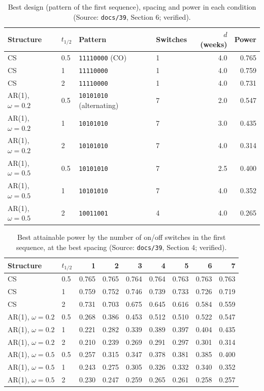 \documentclass[11pt]{article}
\newcommand{\code}[1]{\texttt{#1}}
\begin{document}
\begin{table}[h]
\centering\small
\caption{Best design (pattern of the first sequence), spacing and power
in each condition (Source: \code{docs/39}, Section 6; verified).}
\label{tab:invf-best}
\begin{tabular}{@{}llllrr@{}}
\toprule
Structure & $t_{1/2}$ & Pattern & Switches & $d$ (weeks) & Power \\
\midrule
CS & 0.5 & \code{11110000} (CO) & 1 & 4.0 & 0.765 \\
CS & 1 & \code{11110000} & 1 & 4.0 & 0.759 \\
CS & 2 & \code{11110000} & 1 & 4.0 & 0.731 \\
AR(1), $\omega = 0.2$ & 0.5 & \code{10101010} (alternating) & 7 & 2.0 & 0.547 \\
AR(1), $\omega = 0.2$ & 1 & \code{10101010} & 7 & 3.0 & 0.435 \\
AR(1), $\omega = 0.2$ & 2 & \code{10101010} & 7 & 4.0 & 0.314 \\
AR(1), $\omega = 0.5$ & 0.5 & \code{10101010} & 7 & 2.5 & 0.400 \\
AR(1), $\omega = 0.5$ & 1 & \code{10101010} & 7 & 4.0 & 0.352 \\
AR(1), $\omega = 0.5$ & 2 & \code{10011001} & 4 & 4.0 & 0.265 \\
\bottomrule
\end{tabular}
\end{table}

\begin{table}[h]
\centering\small
\caption{Best attainable power by the number of on/off switches in the
first sequence, at the best spacing (Source: \code{docs/39}, Section 4;
verified).}
\label{tab:invf-switch}
\begin{tabular}{@{}llrrrrrrr@{}}
\toprule
Structure & $t_{1/2}$ & 1 & 2 & 3 & 4 & 5 & 6 & 7 \\
\midrule
CS & 0.5 & 0.765 & 0.765 & 0.764 & 0.764 & 0.763 & 0.763 & 0.763 \\
CS & 1 & 0.759 & 0.752 & 0.746 & 0.739 & 0.733 & 0.726 & 0.719 \\
CS & 2 & 0.731 & 0.703 & 0.675 & 0.645 & 0.616 & 0.584 & 0.559 \\
AR(1), $\omega = 0.2$ & 0.5 & 0.268 & 0.386 & 0.453 & 0.512 & 0.510 & 0.522 & 0.547 \\
AR(1), $\omega = 0.2$ & 1 & 0.221 & 0.282 & 0.339 & 0.389 & 0.397 & 0.404 & 0.435 \\
AR(1), $\omega = 0.2$ & 2 & 0.210 & 0.239 & 0.269 & 0.291 & 0.297 & 0.301 & 0.314 \\
AR(1), $\omega = 0.5$ & 0.5 & 0.257 & 0.315 & 0.347 & 0.378 & 0.381 & 0.385 & 0.400 \\
AR(1), $\omega = 0.5$ & 1 & 0.243 & 0.275 & 0.305 & 0.326 & 0.332 & 0.340 & 0.352 \\
AR(1), $\omega = 0.5$ & 2 & 0.230 & 0.247 & 0.259 & 0.265 & 0.261 & 0.258 & 0.257 \\
\bottomrule
\end{tabular}
\end{table}
\end{document}
